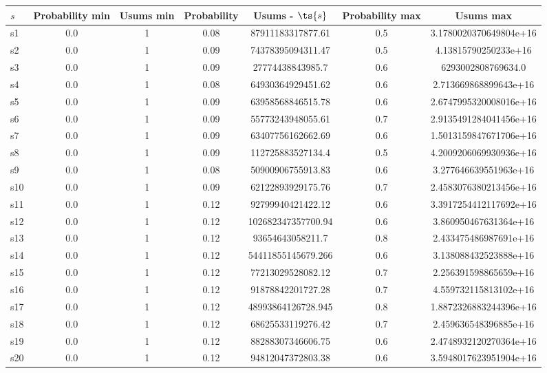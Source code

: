 \documentclass{article}
\begin{document}
\noindent\begin{tabular}{|l|c|c|c|c|c|c|}
\hline
$s$& Probability min & Usums min & Probability & Usums - $\ts{s}$ & Probability max & Usums max\\
\hline
s1 &0.0 & 1 & 0.08 & 87911183317877.61 & 0.5 & 3.1780020370649804e+16\\
\hline
s2 &0.0 & 1 & 0.09 & 74378395094311.47 & 0.5 & 4.13815790250233e+16\\
\hline
s3 &0.0 & 1 & 0.09 & 27774438843985.7 & 0.6 & 6293002808769634.0\\
\hline
s4 &0.0 & 1 & 0.08 & 64930364929451.62 & 0.6 & 2.713669868899643e+16\\
\hline
s5 &0.0 & 1 & 0.09 & 63958568846515.78 & 0.6 & 2.6747995320008016e+16\\
\hline
s6 &0.0 & 1 & 0.09 & 55773243948055.61 & 0.7 & 2.9135491284041456e+16\\
\hline
s7 &0.0 & 1 & 0.09 & 63407756162662.69 & 0.6 & 1.5013159847671706e+16\\
\hline
s8 &0.0 & 1 & 0.09 & 112725883527134.4 & 0.5 & 4.2009206069930936e+16\\
\hline
s9 &0.0 & 1 & 0.08 & 50900906755913.83 & 0.6 & 3.277646639551963e+16\\
\hline
s10 &0.0 & 1 & 0.09 & 62122893929175.76 & 0.7 & 2.4583076380213456e+16\\
\hline
s11 &0.0 & 1 & 0.12 & 92799940421422.12 & 0.6 & 3.3917254412117692e+16\\
\hline
s12 &0.0 & 1 & 0.12 & 102682347357700.94 & 0.6 & 3.860950467631364e+16\\
\hline
s13 &0.0 & 1 & 0.12 & 93654643058211.7 & 0.8 & 2.433475486987691e+16\\
\hline
s14 &0.0 & 1 & 0.12 & 54411855145679.266 & 0.6 & 3.138088432523888e+16\\
\hline
s15 &0.0 & 1 & 0.12 & 77213029528082.12 & 0.7 & 2.256391598865659e+16\\
\hline
s16 &0.0 & 1 & 0.12 & 91878842201727.28 & 0.7 & 4.559732115813102e+16\\
\hline
s17 &0.0 & 1 & 0.12 & 48993864126728.945 & 0.8 & 1.8872326883244396e+16\\
\hline
s18 &0.0 & 1 & 0.12 & 68625533119276.42 & 0.7 & 2.459636548396885e+16\\
\hline
s19 &0.0 & 1 & 0.12 & 88288307346606.75 & 0.6 & 2.4748932120270364e+16\\
\hline
s20 &0.0 & 1 & 0.12 & 94812047372803.38 & 0.6 & 3.5948017623951904e+16\\

\end{tabular}
\end{document}
